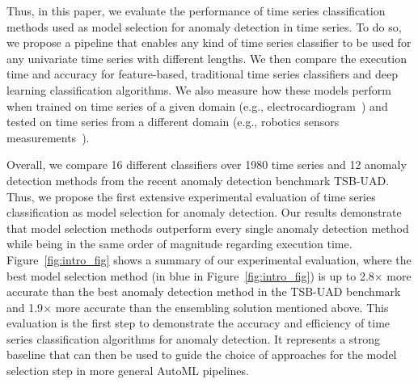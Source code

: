 Thus, in this paper, we evaluate the performance of time series classification methods used as model selection for anomaly detection in time series. To do so, we propose a pipeline that enables any kind of time series classifier to be used for any univariate time series with different lengths. We then compare the execution time and accuracy for feature-based, traditional time series classifiers and deep learning classification algorithms. We also measure how these models perform when trained on time series of a given domain (e.g., electrocardiogram~\cite{Moody}) and tested on time series from a different domain (e.g., robotics sensors measurements~\cite{5573462}). 

Overall, we compare 16 different classifiers over 1980 time series and 12 anomaly detection methods from the recent anomaly detection benchmark TSB-UAD. Thus, we propose the first extensive experimental evaluation of time series classification as model selection for anomaly detection. Our results demonstrate that model selection methods outperform every single anomaly detection method while being in the same order of magnitude regarding execution time. Figure~\ref{fig:intro_fig} shows a summary of our experimental evaluation, where the best model selection method (in blue in Figure~\ref{fig:intro_fig}) is up to 2.8$\times$ more accurate than the best anomaly detection method in the TSB-UAD benchmark and 1.9$\times$ more accurate than the ensembling solution mentioned above. This evaluation is the first step to demonstrate the accuracy and efficiency of time series classification algorithms for anomaly detection. It represents a strong baseline that can then be used to guide the choice of approaches for the model selection step in more general AutoML pipelines.

